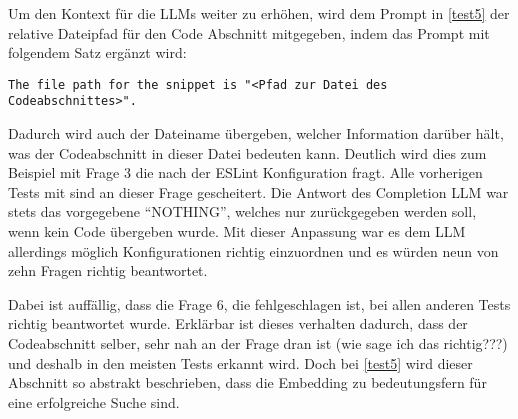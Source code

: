 \documentclass[../main.tex]{subfiles}
\begin{document}
Um den Kontext für die \glspl{LLM} weiter zu erhöhen, wird dem Prompt in \ref{test5} der relative Dateipfad für den Code Abschnitt mitgegeben, indem das Prompt mit folgendem Satz ergänzt wird:
\begin{center}
\begin{lstlisting}
The file path for the snippet is "<Pfad zur Datei des Codeabschnittes>".
\end{lstlisting}
\end{center}

Dadurch wird auch der Dateiname übergeben, welcher Information darüber hält, was der Codeabschnitt in dieser Datei bedeuten kann.
Deutlich wird dies zum Beispiel mit Frage 3 die nach der ESLint Konfiguration fragt.
Alle vorherigen Tests mit sind an dieser Frage gescheitert.
Die Antwort des Completion \gls{LLM} war stets das vorgegebene \enquote{NOTHING}, welches nur zurückgegeben werden soll, wenn kein Code übergeben wurde.
Mit dieser Anpassung war es dem \gls{LLM} allerdings möglich Konfigurationen richtig einzuordnen und es würden neun von zehn Fragen richtig beantwortet.

Dabei ist auffällig, dass die Frage 6, die fehlgeschlagen ist, bei allen anderen Tests richtig beantwortet wurde.
Erklärbar ist dieses verhalten dadurch, dass der Codeabschnitt selber, sehr nah an der Frage dran ist (wie sage ich das richtig???) und deshalb in den meisten Tests erkannt wird.
Doch bei \ref{test5} wird dieser Abschnitt so abstrakt beschrieben, dass die Embedding zu bedeutungsfern für eine erfolgreiche Suche sind.
\end{document}
